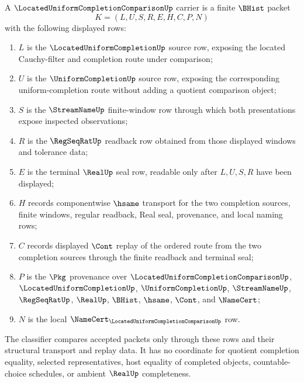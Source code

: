 \begin{definition}
\label{def:located-uniform-completion-comparison-carrier}
A $\LocatedUniformCompletionComparisonUp$ carrier is a finite $\BHist$ packet
$$
K=(L,U,S,R,E,H,C,P,N)
$$
with the following displayed rows:
\begin{enumerate}
\item $L$ is the $\LocatedUniformCompletionUp$ source row, exposing the located Cauchy-filter and completion route under comparison;
\item $U$ is the $\UniformCompletionUp$ source row, exposing the corresponding uniform-completion route without adding a quotient comparison object;
\item $S$ is the $\StreamNameUp$ finite-window row through which both presentations expose inspected observations;
\item $R$ is the $\RegSeqRatUp$ readback row obtained from those displayed windows and tolerance data;
\item $E$ is the terminal $\RealUp$ seal row, readable only after $L,U,S,R$ have been displayed;
\item $H$ records componentwise $\hsame$ transport for the two completion sources, finite windows, regular readback, Real seal, provenance, and local naming rows;
\item $C$ records displayed $\Cont$ replay of the ordered route from the two completion sources through the finite readback and terminal seal;
\item $P$ is the $\Pkg$ provenance over $\LocatedUniformCompletionComparisonUp$, $\LocatedUniformCompletionUp$, $\UniformCompletionUp$, $\StreamNameUp$, $\RegSeqRatUp$, $\RealUp$, $\BHist$, $\hsame$, $\Cont$, and $\NameCert$;
\item $N$ is the local $\NameCert_{\LocatedUniformCompletionComparisonUp}$ row.
\end{enumerate}
The classifier compares accepted packets only through these rows and their structural transport and replay data. It has no coordinate for quotient completion equality, selected representatives, host equality of completed objects, countable-choice schedules, or ambient $\RealUp$ completeness.
\end{definition}

